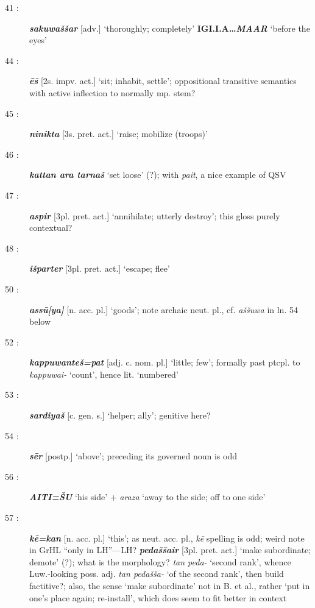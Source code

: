 \documentclass[10pt]{article}
\newcommand{\bit}[1]{\textbf{\textit{#1}}}				%
\newcommand{\p}[1]{{\tiny[{#1}]}}					%
\newcommand{\hith}{\textsubwedge{h}}
\newcommand{\Hith}{\textsubwedge{H}}
\renewcommand{\.}[1]{\textsubdot{#1}}
\begin{document}
\begin{description}
\item[41 :] \bit{sakuwa\v{s}\v{s}ar} \p{adv.} `thoroughly; completely' \textbf{IGI.{\Hith}I.A{\ldots}}\bit{MA{\Hith}AR} `before the eyes'

\item[44 :] \bit{\=e\v{s}} \p{2s. impv. act.} `sit; inhabit, settle'; oppositional transitive semantics with active inflection to normally mp. stem?

\item[45 :] \bit{ninikta} \p{3s. pret. act.} `raise; mobilize (troops)'

\item[46 :] \bit{kattan ar{\hith}a tarna\v{s}} `set loose' (?); with \textit{pait}, a nice example of QSV 

\item[47 :] \bit{{\hith}aspir} \p{3pl. pret. act.} `annihilate; utterly destroy'; this gloss purely contextual?

\item[48 :] \bit{i\v{s}parter} \p{3pl. pret. act.} `escape; flee'

\item[50 :] \bit{ass\=u[ya]} \p{n. acc. pl.} `goods'; note archaic neut. pl., cf. \textit{a\v{s}\v{s}uwa} in ln. 54 below

\item[52 :] \bit{kappuwante\v{s}=pat} \p{adj. c. nom. pl.} `little; few'; formally past ptcpl. to \textit{kappuwai-} `count', hence lit. `numbered'

\item[53 :] \bit{sardiya\v{s}} \p{c. gen. s.} `helper; ally'; genitive here?

\item[54 :] \bit{s\=er} \p{postp.} `above'; preceding its governed noun is odd


\item[56 :] \bit{A{\Hith}ITI=\v{S}U} `his side' + \textit{ara{\hith}za} `away to the side; off to one side'

\item[57 :] \bit{k\=e=kan} \p{n. acc. pl.} `this'; as neut. acc. pl., \textit{k\=e} spelling is odd; weird note in GrHL ``only in LH''---LH? \bit{peda\v{s}\v{s}a{\hith\hith}ir} \p{3pl. pret. act.} `make subordinate; demote' (?); what is the morphology? \textit{tan peda-} `second rank', whence Luw.-looking poss. adj. \textit{tan peda\v{s}\v{s}a-} `of the second rank', then build factitive?; also, the sense `make subordinate' not in B. et al., rather `put in one's place again; re-install', which does seem to fit better in context


\end{description}
\end{document}
